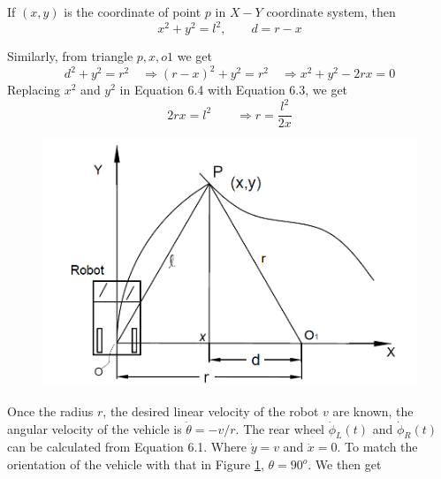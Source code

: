 If $(x,y)$ is the coordinate of point $p$ in $X-Y$ coordinate system, then 
\begin{equation}
x^2+y^2=l^2, \quad \quad d=r-x
\end{equation}

Similarly, from triangle $p, x, o1$ we get
\begin{equation}
d^2+y^2=r^2\quad \Rightarrow (r-x)^2+y^2=r^2 \quad \Rightarrow x^2+y^2-2rx=0
\end{equation}
Replacing $x^2$ and $y^2$ in Equation 6.4 with Equation 6.3, we get
\begin{equation}
\label{ppControl}
2rx=l^2\quad \quad \Rightarrow r=\frac{l^2}{2x}
\end{equation}
\begin{figure}
	\includegraphics[width=\linewidth,keepaspectratio]{Chapter6/fig/purepesuitgeometry2}
	\label{fig:purePGeo} 
\end{figure}

Once the radius $r$, the desired  linear velocity of the robot $v$ are known, the angular velocity of the vehicle is $\dot{\theta}=-v/r$. The rear wheel  $\dot{\phi}_L(t)$ and $\dot{\phi}_R(t)$ can be calculated from Equation 6.1. Where $\dot{y}=v$ and $\dot{x}=0$. To match the orientation of the vehicle with that in  Figure \ref{fig:purePGeo}, $\theta=90^o$. We then get

